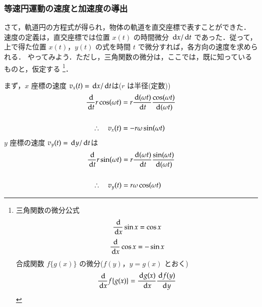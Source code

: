             \subsubsection{等速円運動の速度と加速度の導出}
                さて，軌道円の方程式が得られ，物体の軌道を直交座標で表すことができた．
                速度の定義は，直交座標では位置 $x(t)$ の時間微分 $\,\mathrm{d} x/\,\mathrm{d} t$ であった．従って，
                上で得た位置 $x(t)$，$y(t)$ の式を時間 $t$ で微分すれば，各方向の速度を求められる．
                やってみよう．ただし，三角関数の微分は，ここでは，既に知っているものと，仮定する
                    \footnote{
                        三角関数の微分公式
                            \begin{equation*}
                                \frac{\,\mathrm{d} }{\,\mathrm{d} x} \sin x = \cos x
                            \end{equation*}
                            \begin{equation*}
                                \frac{\,\mathrm{d} }{\,\mathrm{d} x} \cos x = -\sin x
                            \end{equation*}
                        合成関数 $f\{g(x)\}$ の微分($f(y)$，$y=g(x)$ とおく)
                            \begin{equation*}
                                \frac{\,\mathrm{d}}{\,\mathrm{d} x}f\{g(x)\} = \frac{\,\mathrm{d} g(x)}{\,\mathrm{d} x} \frac{\,\mathrm{d} f(y)}{\,\mathrm{d} y}
                            \end{equation*}
                    }．

                まず，$x$ 座標の速度 $v_{x}(t) = \,\mathrm{d} x /\,\mathrm{d} t$は($r$ は半径(定数))
                    \begin{align*}
                        \frac{\,\mathrm{d}}{\,\mathrm{d} t} r\cos(\omega t)
                            &= r\frac{\,\mathrm{d} (\omega t)}{\,\mathrm{d} t}\frac{\cos(\omega t)}{\,\mathrm{d} (\omega t)} \notag \\
                    \notag \\
                        \therefore\quad
                            v_{x}(t) &= -r\omega \sin(\omega t)
                    \end{align*}
                $y$ 座標の速度 $v_{y}(t) = \,\mathrm{d} y /\,\mathrm{d} t$は
                    \begin{align*}
                        \frac{\,\mathrm{d}}{\,\mathrm{d} t} r\sin(\omega t)
                            &= r\frac{\,\mathrm{d} (\omega t)}{\,\mathrm{d} t}\frac{\sin(\omega t)}{\,\mathrm{d} (\omega t)} \notag \\
                    \notag \\
                        \therefore\quad
                            v_{y}(t) &= r\omega \cos(\omega t)
                    \end{align*}

